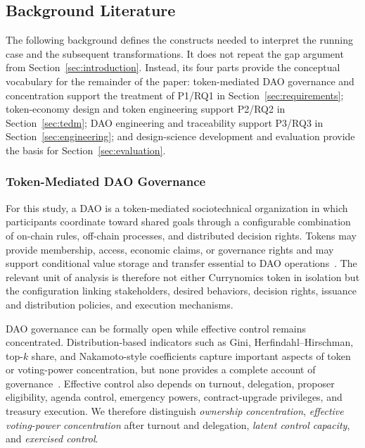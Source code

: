 \documentclass[referee,sn-basic]{sn-jnl}
\begin{document}
\subsection{Background Literature}\label{subsec:background-literature}

The following background defines the constructs needed to interpret the
running case and the subsequent transformations. It does not repeat the gap
argument from Section~\ref{sec:introduction}. Instead, its four parts provide
the conceptual vocabulary for the remainder of the paper: token-mediated DAO
governance and concentration support the treatment of P1/RQ1 in
Section~\ref{sec:requirements}; token-economy design and token engineering
support P2/RQ2 in Section~\ref{sec:tedm}; DAO engineering and traceability
support P3/RQ3 in Section~\ref{sec:engineering}; and design-science development
and evaluation provide the basis for Section~\ref{sec:evaluation}.

\subsubsection{Token-Mediated DAO Governance}\label{subsec:dao-governance}

For this study, a DAO is a token-mediated sociotechnical organization in which
participants coordinate toward shared goals through a configurable combination
of on-chain rules, off-chain processes, and distributed decision rights.
Tokens may provide membership, access, economic claims, or governance rights
and may support conditional value storage and transfer essential to DAO
operations~\cite{rikken2023ins,qin2022web3,wang2019decentralized}. The relevant
unit of analysis is therefore not either Currynomics token in isolation but the
configuration linking stakeholders, desired behaviors, decision rights,
issuance and distribution policies, and execution mechanisms.

DAO governance can be formally open while effective control remains
concentrated. Distribution-based indicators such as Gini,
Herfindahl--Hirschman, top-$k$ share, and Nakamoto-style coefficients capture
important aspects of token or voting-power concentration, but none provides a
complete account of governance~\cite{Fritsch2024VotingPower,
Han2026DAOGovernance}. Effective control also depends on turnout, delegation,
proposer eligibility, agenda control, emergency powers, contract-upgrade
privileges, and treasury execution. We therefore distinguish
\emph{ownership concentration}, \emph{effective voting-power concentration}
after turnout and delegation, \emph{latent control capacity}, and
\emph{exercised control}.
\end{document}
